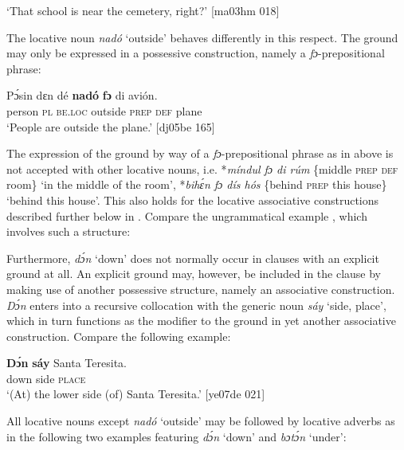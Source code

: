 \glt ‘That school is near the cemetery, right?’ [ma03hm 018]
\z

The locative noun \textit{nadó} ‘outside’ behaves differently in this respect. The ground may only be expressed in a possessive construction, namely a \textit{fɔ}{}-prepositional phrase:


\ea%
    \label{ex:key:928}
    \gll Pɔ́sin  dɛn  dé    \textbf{nadó}  \textbf{fɔ} di  avión.\\
person  \textsc{pl}  \textsc{be.loc}  outside  \textsc{prep}  \textsc{def}  plane\\

\glt ‘People are outside the plane.’ [dj05be 165]
\z

The expression of the ground by way of a \textit{fɔ}-prepositional phrase as in  above is not accepted with other locative nouns, i.e. *\textit{míndul fɔ di rúm} \{middle \textsc{prep def} room\} ‘in the middle of the room’, *\textit{bihɛ́n fɔ dís hós} \{behind \textsc{prep} this house\} ‘behind this house’. This also holds for the locative associative constructions described further below in . Compare the ungrammatical example , which involves such a structure: 


\z

Furthermore, \textit{dɔ́n} ‘down’ does not normally occur in clauses with an explicit ground at all. An explicit ground may, however, be included in the clause by making use of another possessive structure, namely an associative construction. \textit{Dɔ́n} enters into a recursive collocation with the generic noun \textit{sáy} ‘side, place’, which in turn functions as the modifier to the ground in yet another associative construction. Compare the following example: 


\ea%
    \label{ex:key:930}
    \gll \textbf{Dɔ́n}    \textbf{sáy}  Santa  Teresita.\\
down  side  \textsc{place}\\

\glt ‘(At) the lower side (of) Santa Teresita.’ [ye07de 021]
\z

All locative nouns except \textit{nadó} ‘outside’ may be followed by locative adverbs as in the following two examples featuring \textit{dɔ́n} ‘down’ and \textit{bɔtɔ́n} ‘under’: 



